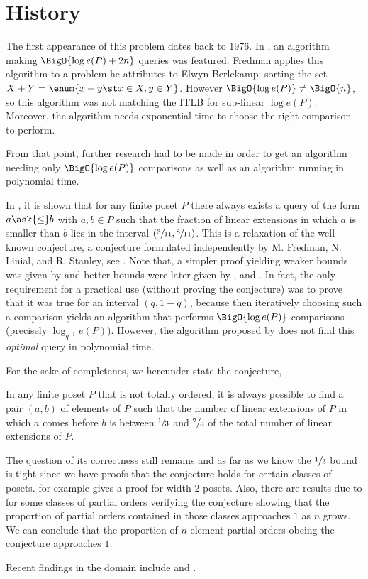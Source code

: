 \section{History}

The first appearance of this problem dates back to 1976. In
\citet*{fredman:1976}, an algorithm making $\BigO{\log e(P) + 2n}$ queries was
featured. Fredman applies this algorithm to a problem he attributes to Elwyn
Berlekamp: sorting the set $X + Y = \enum{x + y \st x \in X, y \in Y}$. However
$\BigO{\log e(P)} \neq \BigO{n}$, so this algorithm was not matching the ITLB
for sub-linear $\log e(P)$. Moreover, the algorithm needs exponential time to
choose the right comparison to perform.

From that point, further research had to be made in order to get an algorithm
needing only $\BigO{\log e(P)}$ comparisons as well as an algorithm running in
polynomial time.

In \citet*{kahn1984balancing}, it is shown that for any finite poset \(P\)
there always exists a query of the form \(a \ask{\leq} b\) with \(a,b \in P\)
such that the fraction of linear extensions in which $a$ is smaller than $b$
lies in the interval $(\sfrac{3}{11}, \sfrac{8}{11})$. This is a relaxation of
the well-known \onethirdtwothird conjecture, a conjecture formulated
independently by M. Fredman, N. Linial, and R. Stanley, see
\citet*{linial:1984}. Note that, a simpler proof yielding weaker
bounds was given by \citet*{kahn1991balancing} and better bounds were later
given by \citet*{brightwell1995balancing}, and \citet*{brightwell1999balanced}.
In fact, the only requirement for a practical use (without proving the
conjecture) was to prove that it was true for an interval $(q, 1-q)$, because
then iteratively choosing such a comparison yields an algorithm that performs
$\BigO{\log e(P)}$ comparisons (precisely $\log_{q^{-1}} e(P)$). However, the
algorithm proposed by \citet*{kahn1984balancing} does not find this
\emph{optimal} query in polynomial time.

For the sake of completenes, we hereunder state the \onethirdtwothird
conjecture,

\begin{conjecture}
In any finite poset $P$ that is not totally ordered, it is always possible to
find a pair $(a,b)$ of elements of $P$ such that the number of linear
extensions of $P$ in which $a$ comes before $b$ is between $\sfrac{1}{3}$ and
$\sfrac{2}{3}$ of the total number of linear extensions of $P$.
\end{conjecture}

The question of its correctness still remains and as far as we know the
$\sfrac{1}{3}$ bound is tight since we have proofs that the conjecture holds
for certain classes of posets. \citet*{linial:1984} for example gives a proof
for width-\(2\) posets. Also, there are results due to
\citet*{peczarski:2006} for some classes of partial orders verifying the
conjecture showing that the proportion of partial orders contained in those
classes approaches $1$ as $n$ grows. We can conclude that the proportion of
$n$-element partial orders obeing the \onethirdtwothird conjecture approaches
$1$.

Recent findings in the domain include \citet*{zaguia:2011} and
\citet*{peczarski:2008}.
